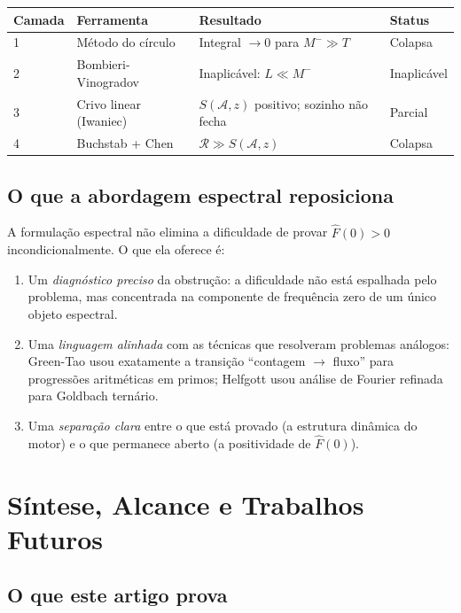 \documentclass[12pt,a4paper]{article}
\theoremstyle{definition}
\begin{document}
	\begin{center}
		\renewcommand{\arraystretch}{1.4}
		\begin{tabular}{llll}
			\toprule
			\textbf{Camada} & \textbf{Ferramenta} & \textbf{Resultado} & \textbf{Status} \\
			\midrule
			1 & Método do círculo & Integral $\to 0$ para $M^- \gg T$ & Colapsa \\
			2 & Bombieri-Vinogradov & Inaplicável: $L \ll M^-$ & Inaplicável \\
			3 & Crivo linear (Iwaniec) & $S(\mathcal{A},z)$ positivo; sozinho não fecha & Parcial \\
			4 & Buchstab + Chen & $\mathcal{R} \gg S(\mathcal{A},z)$ & Colapsa \\
			\bottomrule
		\end{tabular}
	\end{center}
	
	\subsection{O que a abordagem espectral reposiciona}
	
	A formulação espectral não elimina a dificuldade de provar
	$\widehat{F}(0) > 0$ incondicionalmente. O que ela oferece é:
	\begin{enumerate}[label=(\alph*)]
		\item Um \emph{diagnóstico preciso} da obstrução: a dificuldade não
		está espalhada pelo problema, mas concentrada na componente de frequência
		zero de um único objeto espectral.
		\item Uma \emph{linguagem alinhada} com as técnicas que resolveram
		problemas análogos: Green-Tao usou exatamente a transição
		``contagem $\to$ fluxo'' para progressões aritméticas em primos;
		Helfgott \cite{helfgott} usou análise de Fourier refinada para
		Goldbach ternário.
		\item Uma \emph{separação clara} entre o que está provado (a estrutura
		dinâmica do motor) e o que permanece aberto (a positividade de
		$\widehat{F}(0)$).
	\end{enumerate}
	
	\section{Síntese, Alcance e Trabalhos Futuros}
	\label{sec:conclusao}
	
	\subsection{O que este artigo prova}
	
\end{document}
